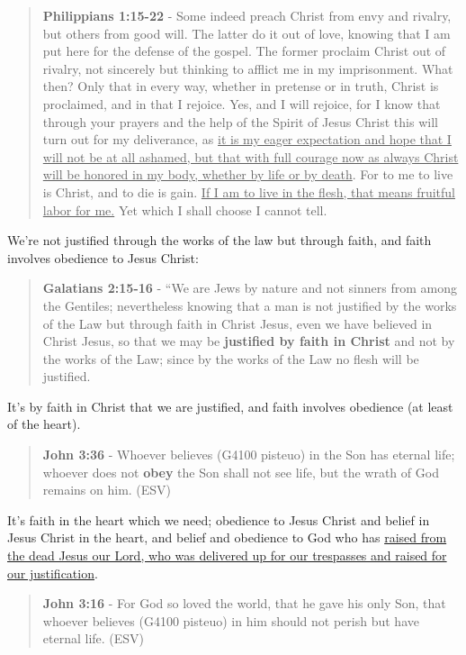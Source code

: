 \documentclass[11pt]{article}
\begin{document}
\begin{quote}
\textbf{Philippians 1:15-22} - Some indeed preach Christ from envy and rivalry, but others from good will. The latter do it out of love, knowing that I am put here for the defense of the gospel. The former proclaim Christ out of rivalry, not sincerely but thinking to afflict me in my imprisonment. What then? Only that in every way, whether in pretense or in truth, Christ is proclaimed, and in that I rejoice. Yes, and I will rejoice, for I know that through your prayers and the help of the Spirit of Jesus Christ this will turn out for my deliverance, as \uline{it is my eager expectation and hope that I will not be at all ashamed, but that with full courage now as always Christ will be honored in my body, whether by life or by death}. For to me to live is Christ, and to die is gain. \uline{If I am to live in the flesh, that means fruitful labor for me.} Yet which I shall choose I cannot tell.
\end{quote}

We're not justified through the works of the law but through faith, and faith involves obedience to Jesus Christ:

\begin{quote}
\textbf{Galatians 2:15-16} - “We are Jews by nature and not sinners from among the Gentiles; nevertheless knowing that a man is not justified by the works of the Law but through faith in Christ Jesus, even we have believed in Christ Jesus, so that we may be \textbf{justified by faith in Christ} and not by the works of the Law; since by the works of the Law no flesh will be justified.
\end{quote}

It's by faith in Christ that we are justified, and faith involves obedience (at least of the heart).

\begin{quote}
\textbf{John 3:36} - Whoever believes (G4100 pisteuo) in the Son has eternal life; whoever does not \textbf{obey} the Son shall not see life, but the wrath of God remains on him. (ESV)
\end{quote}

It's faith in the heart which we need; obedience to Jesus Christ and belief in Jesus Christ in the heart, and belief and obedience to God who has \uline{raised from the dead Jesus our Lord, who was delivered up for our trespasses and raised for our justification}.

\begin{quote}
\textbf{John 3:16} - For God so loved the world, that he gave his only Son, that whoever believes (G4100 pisteuo) in him should not perish but have eternal life. (ESV)
\end{quote}
\end{document}
